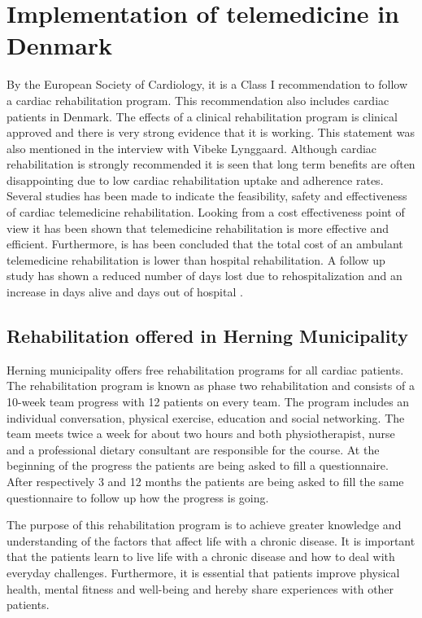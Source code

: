 \section{Implementation of telemedicine in Denmark}
By the European Society of Cardiology, it is a Class I recommendation to follow a cardiac rehabilitation program. This recommendation also includes cardiac patients in Denmark. The effects of a clinical rehabilitation program is clinical approved and there is very strong evidence that it is working. This statement was also mentioned in the interview with Vibeke Lynggaard. Although cardiac rehabilitation is strongly recommended it is seen that long term benefits are often disappointing due to low cardiac rehabilitation uptake and adherence rates. Several studies has been made to indicate the feasibility, safety and effectiveness of cardiac telemedicine rehabilitation. Looking from a cost effectiveness point of view it has been shown that telemedicine rehabilitation is more effective and efficient. Furthermore, is has been concluded that the total cost of an ambulant telemedicine rehabilitation is lower than hospital rehabilitation. A follow up study has shown a reduced number of days lost due to rehospitalization and an increase in days alive and days out of hospital \cite{costeffect, effects}.  

\subsection{Rehabilitation offered in Herning Municipality} 

Herning municipality offers free rehabilitation programs for all cardiac patients. The rehabilitation program is known as phase two rehabilitation and consists of a 10-week team progress with 12 patients on every team. The program includes an individual conversation, physical exercise, education and social networking. The team meets twice a week for about two hours and both physiotherapist, nurse and a professional dietary consultant are responsible for the course. At the beginning of the progress the patients are being asked to fill a questionnaire. After respectively 3 and 12 months the patients are being asked to fill the same questionnaire to follow up how the progress is going. 

The purpose of this rehabilitation program is to achieve greater knowledge and understanding of the factors that affect life with a chronic disease. It is important that the patients learn to live life with a chronic disease and how to deal with everyday challenges. Furthermore, it is essential that patients improve physical health, mental fitness and well-being and hereby share experiences with other patients. 


